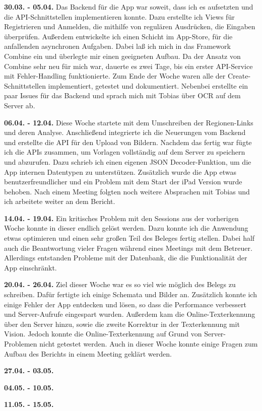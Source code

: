 \documentclass[nomenclature, oneside, 150]{HSMW-Thesis}
\begin{document}
	\textbf{30.03. - 05.04.} 
	Das Backend für die App war soweit, dass ich es aufsetzten und die API-Schnittstellen implementieren konnte. Dazu erstellte ich Views für Registrieren und Anmelden, die mithilfe von regulären Ausdrücken, die Eingaben überprüfen. Außerdem entwickelte ich einen Schicht im App-Store, für die anfallenden asynchronen Aufgaben. Dabei laß ich mich in das Framework Combine ein und überlegte mir einen geeigneten Aufbau. Da der Ansatz von Combine sehr neu für mich war, dauerte es zwei Tage, bis ein erster API-Service mit Fehler-Handling funktionierte. Zum Ende der Woche waren alle der Create-Schnittstellen implementiert, getestet und dokumentiert. Nebenbei erstellte ein paar Issues für das Backend und sprach mich mit Tobias über OCR auf dem Server ab.
	
	\textbf{06.04. - 12.04.}
	Diese Woche startete mit dem Umschreiben der Regionen-Links und deren Analyse. Anschließend integrierte ich die Neuerungen vom Backend und erstellte die API für den Upload von Bildern. Nachdem das fertig war fügte ich die APIs zusammen, um Vorlagen vollständig auf dem Server zu speichern und abzurufen. Dazu schrieb ich einen eigenen JSON Decoder-Funktion, um die App internen Datentypen zu unterstützen. Zusätzlich wurde die App etwas benutzerfreundlicher und ein Problem mit dem Start der iPad Version wurde behoben. Nach einem Meeting folgten noch weitere Absprachen mit Tobias und ich arbeitete weiter an dem Bericht.
	
	\textbf{14.04. - 19.04.}
	Ein kritisches Problem mit den Sessions aus der vorherigen Woche konnte in dieser endlich gelöst werden. Dazu konnte ich die Anwendung etwas optimieren und einen sehr großen Teil des Beleges fertig stellen. Dabei half auch die Beantwortung vieler Fragen während eines Meetings mit dem Betreuer. Allerdings entstanden Probleme mit der Datenbank, die die Funktionalität der App einschränkt.
	
	\textbf{20.04. - 26.04.}
	Ziel dieser Woche war es so viel wie möglich des Belegs zu schreiben. Dafür fertigte ich einige Schemata und Bilder an. Zusätzlich konnte ich einige Fehler der App entdecken und lösen, so dass die Performance verbessert und Server-Aufrufe eingespart wurden. Außerdem kam die Online-Texterkennung über den Server hinzu, sowie die zweite Korrektur in der Texterkennung mit Vision. Jedoch konnte die Online-Texterkennung auf Grund von Server-Problemen nicht getestet werden. Auch in dieser Woche konnte einige Fragen zum Aufbau des Berichts in einem Meeting geklärt werden. 
	
	\textbf{27.04. - 03.05.}
	
	\textbf{04.05. - 10.05.}
	
	\textbf{11.05. - 15.05.}




\end{document}
